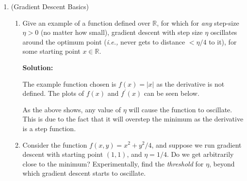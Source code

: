\documentclass[12pt]{article}
\newcommand{\abs}[1]{\left| #1 \right|}
\newcommand{\R}{\mathbb{R}}
\begin{document}
\begin{enumerate}
\begin{enumerate}
\end{enumerate}

\newpage

\item (Gradient Descent Basics)

\begin{enumerate}
  \item Give an example of a function defined over $\R$, for which for {\em any} step-size $\eta > 0$ (no matter how small), gradient descent with step size $\eta$ oscillates around the optimum point ({\em i.e.,} never gets to distance $< \eta / 4$ to it), for some starting point $x \in \R$.

      {\bf Solution:}

The example function chosen is $f(x) = \abs{x}$ as the derivative is not defined. The plots of $f(x)$ and $f^{\prime}(x)$ can be seen below.

\hspace{-2.5em}
\hspace{-2.5em}
{ %
\pgfplotsset{ymin=-1.25, ymax=1.25}
}

As the above shows, any value of $\eta$ will cause the function to oscillate. This is due to the fact that it will overstep the minimum as the derivative is a step function.



\item Consider the function $f(x,y) = x^{2} + y^{2}/4$, and suppose we run gradient descent with starting point $(1,1)$, and $\eta = 1/4$. Do we get arbitrarily close to the minimum? Experimentally, find the {\em threshold} for $\eta$, beyond which gradient descent starts to oscillate.


\end{enumerate}
\end{enumerate}
\end{document}

